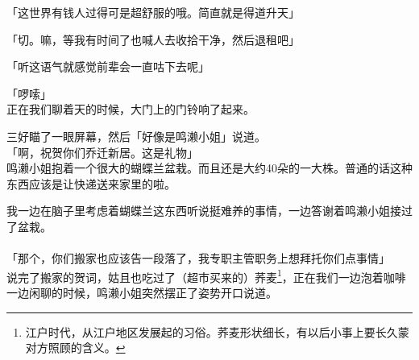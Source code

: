 「这世界有钱人过得可是超舒服的哦。简直就是得道升天」

「切。嘛，等我有时间了也喊人去收拾干净，然后退租吧」

「听这语气就感觉前辈会一直咕下去呢」

「啰嗦」\\

正在我们聊着天的时候，大门上的门铃响了起来。

三好瞄了一眼屏幕，然后「好像是鸣濑小姐」说道。\\

「啊，祝贺你们乔迁新居。这是礼物」\\

鸣濑小姐抱着一个很大的蝴蝶兰盆栽。而且还是大约40朵的一大株。普通的话这种东西应该是让快递送来家里的啦。

我一边在脑子里考虑着蝴蝶兰这东西听说挺难养的事情，一边答谢着鸣濑小姐接过了盆栽。\\

\sqsplit\\

「那个，你们搬家也应该告一段落了，我专职主管职务上想拜托你们点事情」\\

说完了搬家的贺词，姑且也吃过了（超市买来的）荞麦\footnote{江户时代，从江户地区发展起的习俗。荞麦形状细长，有以后小事上要长久蒙对方照顾的含义。}，正在我们一边泡着咖啡一边闲聊的时候，鸣濑小姐突然摆正了姿势开口说道。\\

